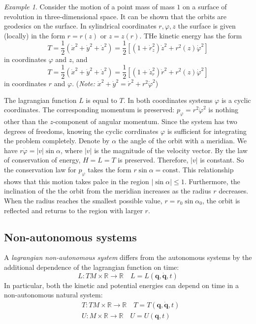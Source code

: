 \documentclass[conference]{IEEEtran}
\theoremstyle{definition}
\theoremstyle{remark}
\newtheorem{exmp}{Example}
\begin{document}
    \begin{exmp}
        Consider the motion of a point mass of mass $1$ on a surface of revolution in three-dimensional space. It can be shown that the orbits are geodesics on the surface. In sylindrical coordinates $r, \varphi, z$ the surface is given (locally) in the form $r = r(z)$ or $z = z(r)$. THe kinetic energy has the form
        \begin{equation*}
            T = \frac12 (\dot{x}^2 + \dot{y}^2 + \dot{z}^2) = \frac12 [(1 + \dot{r}_z^2) \dot{z}^2 + r^2(z) \dot{\varphi}^2 ]
        \end{equation*}
        in coordinates $\varphi$ and $z$, and
        \begin{equation*}
            T = \frac12 (\dot{x}^2 + \dot{y}^2 + \dot{z}^2) = \frac12 [(1 + \dot{z}_r^2) \dot{r}^2 + r^2(z) \dot{\varphi}^2 ]
        \end{equation*}
        in coordinates $r$ and $\varphi$. (\emph{Note:} $\dot{x}^2 + \dot{y}^2 = \dot{r}^2 + r^2 \dot{\varphi}^2$)

        The lagrangian function $L$ is equal to $T$. In both coordinates systems $\varphi$ is a cyclic coordinates. The corresponding momentum is preserved: $p_{\varphi} = r^2 \dot{\varphi}^2$ is nothing other than the $z$-component of angular momentum. Since the system has two degrees of freedoms, knowing the cyclic corrdinates $\varphi$ is sufficient for integrating the problem completely. Denote by $\alpha$ the angle of the orbit with a meridian. We have $r\dot{\varphi} = |v| \sin \alpha$, where $|v|$ is the magnitude of the velocity vector. By the law of conservation of energy, $H = L = T$ is preserved. Therefore, $|v|$ is constant. So the conservation law for $p_{\varphi}$ takes the form $r \sin \alpha = \text{const}$. This relationship shows that this motion takes palce in the region $|\sin \alpha| \leq 1$. Furthermore, the inclination of the the orbit from the meridian increases as the radius $r$ decreases. When the radius reaches the smallest possible value, $r = r_0 \sin \alpha_0$, the orbit is reflected and returns to the region with larger $r$.
    \end{exmp}

    \subsection{Non-autonomous systems}
    A \emph{lagrangian non-autonomous system} differs from the autonomous systems by the additional dependence of the lagrangian function on time:
    \begin{equation*}
        L: TM \times \mathbb{R} \to \mathbb{R} \quad L = L(\mathbf{q}, \dot{\mathbf{q}}, t)
    \end{equation*}
    In particular, both the kinetic and potential energies can depend on time in a non-autonomous natural system:
    \begin{align*}
        &T: TM \times \mathbb{R} \to \mathbb{R} \quad T = T(\mathbf{q}, \dot{\mathbf{q}}, t) \\
        &U: M \times \mathbb{R} \to \mathbb{R} \quad U = U(\mathbf{q}, t)
    \end{align*}
\end{document}
